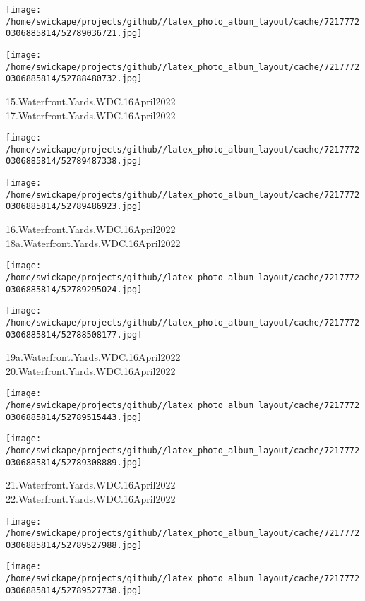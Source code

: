 \documentclass[10pt,letterpaper]{article}
\begin{document}
\texttt{[image: /home/swickape/projects/github//latex\_photo\_album\_layout/cache/72177720306885814/52789036721.jpg]}

\vspace{0.25in}
\texttt{[image: /home/swickape/projects/github//latex\_photo\_album\_layout/cache/72177720306885814/52788480732.jpg]}

15.Waterfront.Yards.WDC.16April2022\\
17.Waterfront.Yards.WDC.16April2022
\pagebreak

\texttt{[image: /home/swickape/projects/github//latex\_photo\_album\_layout/cache/72177720306885814/52789487338.jpg]}

\vspace{0.25in}
\texttt{[image: /home/swickape/projects/github//latex\_photo\_album\_layout/cache/72177720306885814/52789486923.jpg]}

16.Waterfront.Yards.WDC.16April2022\\
18a.Waterfront.Yards.WDC.16April2022
\pagebreak

\texttt{[image: /home/swickape/projects/github//latex\_photo\_album\_layout/cache/72177720306885814/52789295024.jpg]}

\vspace{0.25in}
\texttt{[image: /home/swickape/projects/github//latex\_photo\_album\_layout/cache/72177720306885814/52788508177.jpg]}

19a.Waterfront.Yards.WDC.16April2022\\
20.Waterfront.Yards.WDC.16April2022
\pagebreak

\texttt{[image: /home/swickape/projects/github//latex\_photo\_album\_layout/cache/72177720306885814/52789515443.jpg]}

\vspace{0.25in}
\texttt{[image: /home/swickape/projects/github//latex\_photo\_album\_layout/cache/72177720306885814/52789308889.jpg]}

21.Waterfront.Yards.WDC.16April2022\\
22.Waterfront.Yards.WDC.16April2022
\pagebreak

\texttt{[image: /home/swickape/projects/github//latex\_photo\_album\_layout/cache/72177720306885814/52789527988.jpg]}

\vspace{0.25in}
\texttt{[image: /home/swickape/projects/github//latex\_photo\_album\_layout/cache/72177720306885814/52789527738.jpg]}
\end{document}
